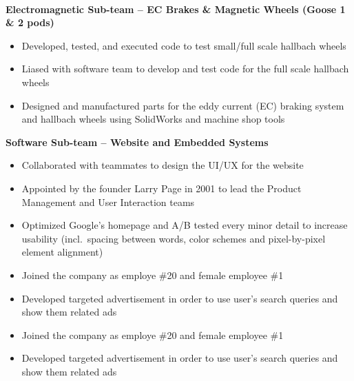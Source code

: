 \documentclass[8pt,a4paper]{altacv}
\begin{document}
 \\
\textbf{Electromagnetic Sub-team -- EC Brakes \& Magnetic Wheels (Goose 1 \& 2 pods)} \\
\begin{itemize}
\item Developed, tested, and executed code to test small/full scale hallbach wheels
\item Liased with software team to develop and test code for the full scale hallbach wheels
\item Designed and manufactured parts for the eddy current (EC) braking system and hallbach wheels using SolidWorks and machine shop tools
\end{itemize}
\textbf{Software Sub-team -- Website and Embedded Systems}\\
\begin{itemize}
\item Collaborated with teammates to design the UI/UX for the website
\end{itemize}
\divider

\begin{itemize}
\item Appointed by the founder Larry Page in 2001 to lead the Product Management and User Interaction teams
\item Optimized Google's homepage and A/B tested every minor detail to increase usability (incl.~spacing between words, color schemes and pixel-by-pixel element alignment)
\end{itemize}
\divider

\begin{itemize}
\item Joined the company as employe \#20 and female employee \#1
\item Developed targeted advertisement in order to use user's search queries and show them related ads
\end{itemize}

\begin{itemize}
\item Joined the company as employe \#20 and female employee \#1
\item Developed targeted advertisement in order to use user's search queries and show them related ads
\end{itemize}
\end{document}
